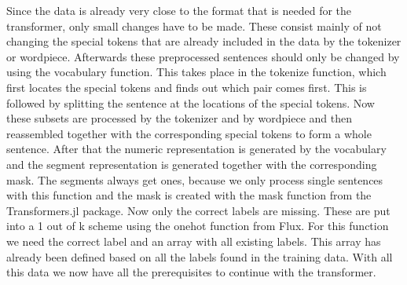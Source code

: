Since the data is already very close to the format that is needed for the transformer, only small changes have to be made. These consist mainly of not changing the special tokens that are already included in the data by the tokenizer or wordpiece. Afterwards these preprocessed sentences should only be changed by using the vocabulary function. This takes place in the tokenize function, which first locates the special tokens and finds out which pair comes first. This is followed by splitting the sentence at the locations of the special tokens. Now these subsets are processed by the tokenizer and by wordpiece and then reassembled together with the corresponding special tokens to form a whole sentence. After that the numeric representation is generated by the vocabulary and the segment representation is generated together with the corresponding mask. The segments always get ones, because we only process single sentences with this function and the mask is created with the mask function from the Transformers.jl \cite{Cheng2020} package. Now only the correct labels are missing. These are put into a 1 out of k scheme using the onehot function from Flux. \cite{Flux.jl-2018,innes:2018} For this function we need the correct label and an array with all existing labels. This array has already been defined based on all the labels found in the training data. With all this data we now have all the prerequisites to continue with the transformer. 


